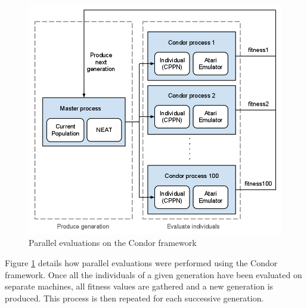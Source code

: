 \documentclass{acm_proc_article-sp}
\begin{document}

\begin{figure}[ht]
\begin{center}
\includegraphics[width=\columnwidth]{figures/condor-hyperneat-small.png}
\end{center}
\caption{Parallel evaluations on the Condor framework}
\label{fig:condor}
\end{figure}

Figure \ref{fig:condor} details how parallel evaluations were performed using the Condor framework. Once all the individuals of a given generation have been evaluated on separate machines, all fitness values are gathered and a new generation is produced. This process is then repeated for each successive generation. 
\end{document}
